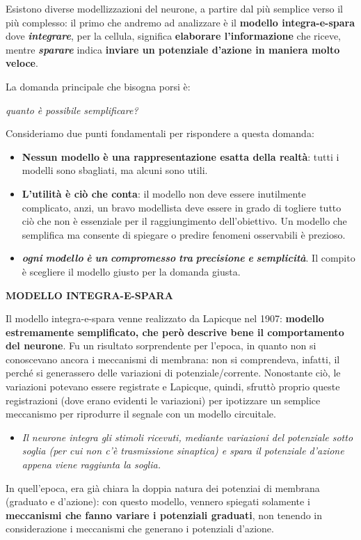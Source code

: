 \documentclass[12pt,a4paper,openany]{book}
\begin{document}
Esistono diverse modellizzazioni del neurone, a partire dal più semplice verso il più complesso: il primo che andremo ad analizzare è il \textbf{modello integra-e-spara }dove \textbf{\textit{integrare}}, per la cellula, significa \textbf{elaborare l'informazione }che riceve, mentre \textbf{\textit{sparare}}\textbf{\textit{ }}indica \textbf{inviare un potenziale d'azione in maniera molto veloce}.

La domanda principale che bisogna porsi è:

\textit{quanto è possibile semplificare?}

Consideriamo due punti fondamentali per rispondere a questa domanda:

\begin{itemize}
  \item \textbf{Nessun modello è una rappresentazione esatta della realtà}: tutti i modelli sono sbagliati, ma alcuni sono utili.
  \item \textbf{L'utilità è ciò che conta}: il modello non deve essere inutilmente complicato, anzi, un bravo modellista deve essere in grado di togliere tutto ciò che non è essenziale per il raggiungimento dell'obiettivo. Un modello che semplifica ma consente di spiegare o predire fenomeni osservabili è prezioso.
  \item \textbf{\textit{ogni}}\textbf{\textit{ }}\textbf{\textit{modello}}\textbf{\textit{ }}\textbf{\textit{è}}\textbf{\textit{ }}\textbf{\textit{un}}\textbf{\textit{ }}\textbf{\textit{compromesso}}\textbf{\textit{ }}\textbf{\textit{tra}}\textbf{\textit{ }}\textbf{\textit{precisione}}\textbf{\textit{ }}\textbf{\textit{e}}\textbf{\textit{ }}\textbf{\textit{semplicità}}. Il compito è scegliere il modello giusto per la domanda giusta.
\end{itemize}
\textbf{MODELLO  INTEGRA-E-SPARA}

Il modello integra-e-spara venne realizzato da Lapicque nel 1907: \textbf{modello estremamente semplificato, che però descrive bene il comportamento del neurone}. Fu un risultato sorprendente per l'epoca, in quanto non si conoscevano ancora i meccanismi di membrana: non si comprendeva, infatti, il perché si generassero delle variazioni di potenziale/corrente. Nonostante ciò, le variazioni potevano essere registrate e Lapicque, quindi, sfruttò proprio queste registrazioni (dove erano evidenti le variazioni) per ipotizzare un semplice meccanismo per riprodurre il segnale con un modello circuitale.

\begin{itemize}
  \item \textit{Il neurone integra gli stimoli ricevuti, mediante variazioni del potenziale sotto soglia (per cui non c'è trasmissione sinaptica) e spara il potenziale d'azione appena viene raggiunta la soglia.}
\end{itemize}
In quell'epoca, era già chiara la doppia natura dei potenziai di membrana (graduato e d'azione): con questo modello, vennero spiegati solamente i \textbf{meccanismi che fanno variare i potenziali graduati}, non tenendo in considerazione i meccanismi che generano i potenziali d'azione.
\end{document}
